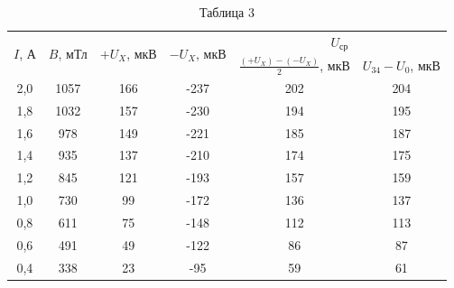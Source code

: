 \documentclass[a4paper,12pt]{article} %
\begin{document}
\begin{table}[h!]
	\centering
	\begin{tabular}{|c|c|c|c|c|c|}
		\hline
		\multirow{2}{*}{$I$, А} & \multirow{2}{*}{$B$, мТл} & \multirow{2}{*}{$+U_X$, мкВ} & \multirow{2}{*}{$-U_X$, мкВ} & \multicolumn{2}{c|}{$U_{\text{ср}}$}                   \\ \cline{5-6} 
		&                           &                              &                              & $\frac{(+U_X) - (-U_X)}{2}$, мкВ & $U_{34} - U_0$, мкВ \\ \hline
		2,0                     & 1057                      & 166                          & -237                         & 202                              & 204                 \\ \hline
		1,8                     & 1032                      & 157                          & -230                         & 194                              & 195                 \\ \hline
		1,6                     & 978                       & 149                          & -221                         & 185                              & 187                 \\ \hline
		1,4                     & 935                       & 137                          & -210                         & 174                              & 175                 \\ \hline
		1,2                     & 845                       & 121                          & -193                         & 157                              & 159                 \\ \hline
		1,0                     & 730                       & 99                           & -172                         & 136                              & 137                 \\ \hline
		0,8                     & 611                       & 75                           & -148                         & 112                              & 113                 \\ \hline
		0,6                     & 491                       & 49                           & -122                         & 86                               & 87                  \\ \hline
		0,4                     & 338                       & 23                           & -95                          & 59                               & 61                  \\ \hline
	\end{tabular}
	\caption*{Таблица 3}
\end{table}
\end{document}
